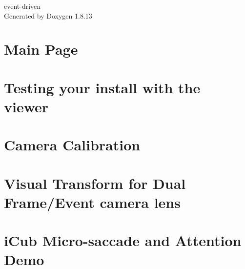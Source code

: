 \documentclass[twoside]{book}
\newcommand{\+}{\discretionary{\mbox{\scriptsize$\hookleftarrow$}}{}{}}
\newcommand{\clearemptydoublepage}{%
  \newpage{\pagestyle{empty}\cleardoublepage}%
}
\begin{document}
\hypersetup{pageanchor=false,
             bookmarksnumbered=true,
             pdfencoding=unicode
            }
\begin{titlepage}
\vspace*{7cm}
\begin{center}%
{\Large event-\/driven }\\
\vspace*{1cm}
{\large Generated by Doxygen 1.8.13}\\
\end{center}
\end{titlepage}
\clearemptydoublepage
{}
\tableofcontents
\clearemptydoublepage
{}
\hypersetup{pageanchor=true}

\chapter{Main Page}
\label{index}\hypertarget{index}{}
\chapter{Testing your install with the viewer}
\label{md__mnt_d_projects_event-driven_documentation_1viewer}

\chapter{Camera Calibration}
\label{md__mnt_d_projects_event-driven_documentation_2calibration}

\chapter{Visual Transform for Dual Frame/\+Event camera lens}
\label{md__mnt_d_projects_event-driven_documentation_application_instructions_3a_8dualcam}

\chapter{i\+Cub Micro-\/saccade and Attention Demo}
\label{md__mnt_d_projects_event-driven_documentation_application_instructions_3b_8autosaccade}

\end{document}
